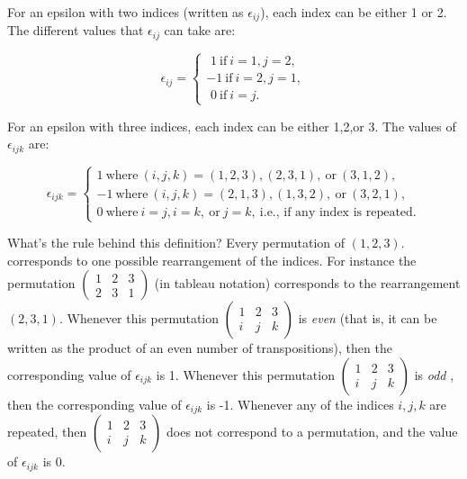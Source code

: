 For an epsilon with two indices (written as $\epsilon_{ij}$), each index can be either 1 or 2. The different values that $\epsilon_{ij}$ can take are:

\[ \epsilon_{ij}=
\begin{cases}
\,\,1 ~ \text{if} ~ i=1, j=2,  \\
-1 ~ \text{if} ~ i=2, j=1,  \\
\,\, 0 ~ \text{if} ~ i=j.
\end{cases} \]

For an epsilon with three indices, each index can be either 1,2,or 3. The values of $\epsilon_{ijk}$ are:

\[ \epsilon_{ijk}=
\begin{cases}
1 ~ \text{where} ~ (i,j,k)= (1,2,3),  (2,3,1),  \mathrm{~or~}(3,1,2), \\
-1 ~ \text{where} ~ (i,j,k) = (2,1,3), (1,3,2),  \mathrm{~or~}(3,2,1),  \\
0 ~ \text{where} ~  i=j, i=k, ~ \text{or} ~ j=k, ~ \text{i.e., if any index is repeated.}
\end{cases} \]

What's the rule behind this definition?  Every permutation of $(1,2,3)$.  corresponds to one possible rearrangement of the indices. For instance the permutation 
$ \left( \begin{smallmatrix}  1 & 2 & 3  \\ 2 & 3 & 1  \end{smallmatrix} \right)$ (in tableau notation) corresponds to the rearrangement $(2,3,1)$.  Whenever this permutation $\left( \begin{smallmatrix} 1 & 2 & 3  \\ i & j & k  \end{smallmatrix} \right) $ is \emph{even} (that is, it can be written as the product of an even number of transpositions), then the corresponding value of $\epsilon_{ijk}$ is 1. Whenever this permutation $\left( \begin{smallmatrix} 1 & 2 & 3  \\ i & j & k  \end{smallmatrix} \right)$ is \emph{odd} , then the corresponding value of $\epsilon_{ijk}$ is -1. Whenever any of the indices $i,j,k$  are repeated, then  $\left( \begin{smallmatrix} 1 & 2 & 3  \\ i & j & k  \end{smallmatrix} \right) $ does not correspond to a permutation, and the value of $\epsilon_{ijk}$ is 0.

